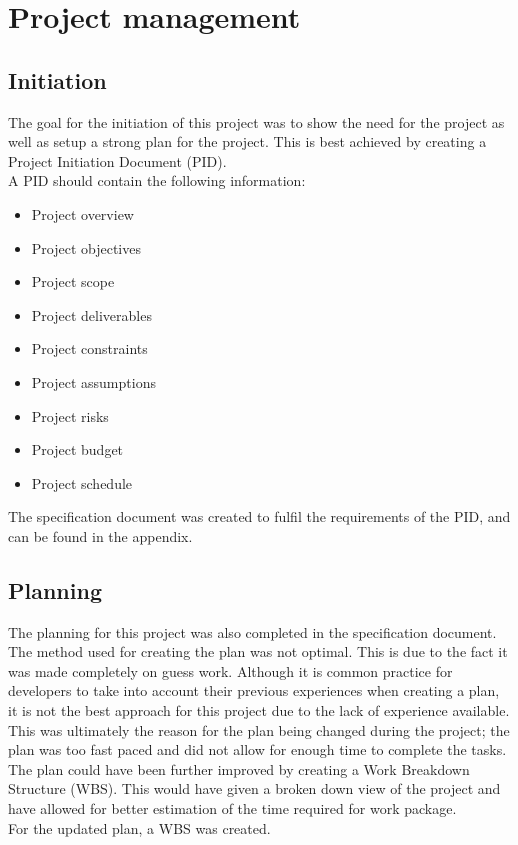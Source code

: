 \usepackage{rotating}

\section{Project management}

\subsection{Initiation}
The goal for the initiation of this project was to show the need for the project as well as setup
a strong plan for the project. This is best achieved by creating a Project Initiation Document (PID).\\
A PID should contain the following information:
\begin{itemize}
    \item Project overview
    \item Project objectives
    \item Project scope
    \item Project deliverables
    \item Project constraints
    \item Project assumptions
    \item Project risks
    \item Project budget
    \item Project schedule
\end{itemize}\cite{}
The specification document was created to fulfil the requirements of the PID, and can be found in the appendix.

\subsection{Planning}
The planning for this project was also completed in the specification document. The method used for creating the plan was
not optimal. This is due to the fact it was made completely on guess work. Although it is common practice for developers
to take into account their previous experiences when creating a plan, it is not the best approach for this project due to
the lack of experience available. This was ultimately the reason for the plan being changed during the project; the plan
was too fast paced and did not allow for enough time to complete the tasks.\\

The plan could have been further improved by creating a Work Breakdown Structure (WBS). This would have given a broken
down view of the project and have allowed for better estimation of the time required for work package.\\
For the updated plan, a WBS was created.



